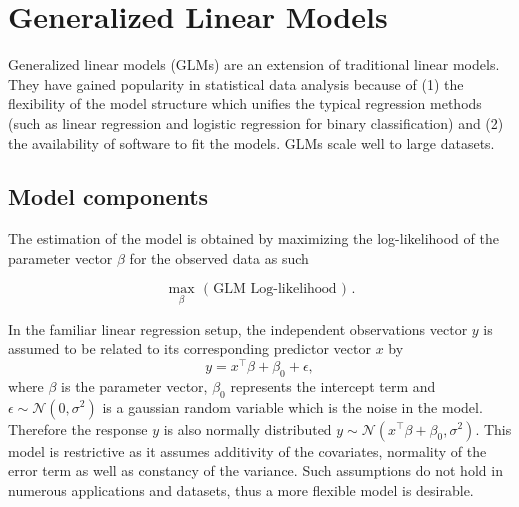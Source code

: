 \section{Generalized Linear Models}

Generalized linear models (GLMs) are an extension of traditional linear models. They have gained popularity in statistical data analysis because of (1) the flexibility of the model structure which unifies the typical regression methods (such as linear regression and logistic regression for binary classification) and (2) the availability of software to fit the models. GLMs scale well to large datasets. 

\subsection{Model components}

The estimation of the model is obtained by maximizing the log-likelihood of the parameter vector $\beta$ for the observed data as such

 $$\max_{\beta} \mbox{ ( GLM Log-likelihood ) }.$$


In the familiar linear regression setup, the independent observations vector $y$ is assumed to be related to its corresponding predictor vector $x$ by $$y = x^{\top}\beta + \beta_0 + \epsilon,$$ where $\beta$ is the parameter vector, $\beta_0$ represents the intercept term and $\epsilon \sim \mathcal{N}( 0, \sigma^2 )$ is a gaussian random variable which is the noise in the model. Therefore the response $y$ is also normally distributed $y \sim \mathcal{N}( x^{\top} \beta + \beta_0, \sigma^2 )$. This model is restrictive as it assumes additivity of the covariates, normality of the error term as well as constancy of the variance. Such assumptions do not hold in numerous applications and datasets, thus a more flexible model is desirable. 


